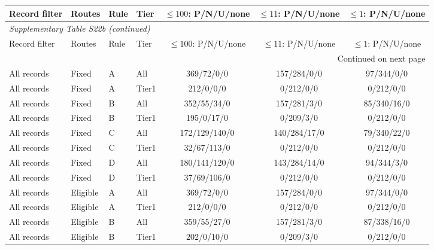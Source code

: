 \begin{longtable}{llllccc}

\toprule Record filter & Routes & Rule & Tier & $\leq100$: P/N/U/none & $\leq11$: P/N/U/none & $\leq1$: P/N/U/none \\ \midrule\endfirsthead

\multicolumn{7}{l}{\textit{Supplementary Table S22b (continued)}} \\

\toprule Record filter & Routes & Rule & Tier & $\leq100$: P/N/U/none & $\leq11$: P/N/U/none & $\leq1$: P/N/U/none \\ \midrule\endhead

\midrule\multicolumn{7}{r}{Continued on next page}\\\endfoot\bottomrule\endlastfoot

All records & Fixed & A & All & 369/72/0/0 & 157/284/0/0 & 97/344/0/0 \\

All records & Fixed & A & Tier1 & 212/0/0/0 & 0/212/0/0 & 0/212/0/0 \\

All records & Fixed & B & All & 352/55/34/0 & 157/281/3/0 & 85/340/16/0 \\

All records & Fixed & B & Tier1 & 195/0/17/0 & 0/209/3/0 & 0/212/0/0 \\

All records & Fixed & C & All & 172/129/140/0 & 140/284/17/0 & 79/340/22/0 \\

All records & Fixed & C & Tier1 & 32/67/113/0 & 0/212/0/0 & 0/212/0/0 \\

All records & Fixed & D & All & 180/141/120/0 & 143/284/14/0 & 94/344/3/0 \\

All records & Fixed & D & Tier1 & 37/69/106/0 & 0/212/0/0 & 0/212/0/0 \\

All records & Eligible & A & All & 369/72/0/0 & 157/284/0/0 & 97/344/0/0 \\

All records & Eligible & A & Tier1 & 212/0/0/0 & 0/212/0/0 & 0/212/0/0 \\

All records & Eligible & B & All & 359/55/27/0 & 157/281/3/0 & 87/338/16/0 \\

All records & Eligible & B & Tier1 & 202/0/10/0 & 0/209/3/0 & 0/212/0/0 \\


\end{longtable}
